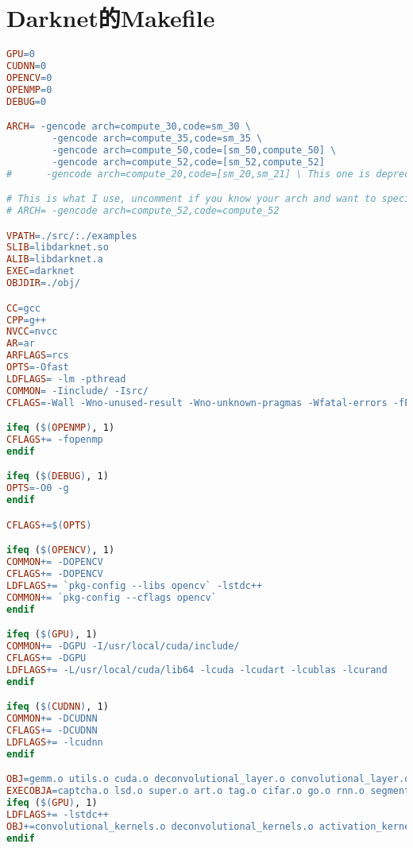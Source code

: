 \chapter{Darknet的Makefile}\label{apdx:Darknet的Makefile}
\begin{lstlisting}[language=make]
GPU=0
CUDNN=0
OPENCV=0
OPENMP=0
DEBUG=0

ARCH= -gencode arch=compute_30,code=sm_30 \
        -gencode arch=compute_35,code=sm_35 \
        -gencode arch=compute_50,code=[sm_50,compute_50] \
        -gencode arch=compute_52,code=[sm_52,compute_52]
#      -gencode arch=compute_20,code=[sm_20,sm_21] \ This one is deprecated?

# This is what I use, uncomment if you know your arch and want to specify
# ARCH= -gencode arch=compute_52,code=compute_52

VPATH=./src/:./examples
SLIB=libdarknet.so
ALIB=libdarknet.a
EXEC=darknet
OBJDIR=./obj/

CC=gcc
CPP=g++
NVCC=nvcc 
AR=ar
ARFLAGS=rcs
OPTS=-Ofast
LDFLAGS= -lm -pthread 
COMMON= -Iinclude/ -Isrc/
CFLAGS=-Wall -Wno-unused-result -Wno-unknown-pragmas -Wfatal-errors -fPIC

ifeq ($(OPENMP), 1) 
CFLAGS+= -fopenmp
endif

ifeq ($(DEBUG), 1) 
OPTS=-O0 -g
endif

CFLAGS+=$(OPTS)

ifeq ($(OPENCV), 1) 
COMMON+= -DOPENCV
CFLAGS+= -DOPENCV
LDFLAGS+= `pkg-config --libs opencv` -lstdc++
COMMON+= `pkg-config --cflags opencv` 
endif

ifeq ($(GPU), 1) 
COMMON+= -DGPU -I/usr/local/cuda/include/
CFLAGS+= -DGPU
LDFLAGS+= -L/usr/local/cuda/lib64 -lcuda -lcudart -lcublas -lcurand
endif

ifeq ($(CUDNN), 1) 
COMMON+= -DCUDNN 
CFLAGS+= -DCUDNN
LDFLAGS+= -lcudnn
endif

OBJ=gemm.o utils.o cuda.o deconvolutional_layer.o convolutional_layer.o list.o image.o activations.o im2col.o col2im.o blas.o crop_layer.o dropout_layer.o maxpool_layer.o softmax_layer.o data.o matrix.o network.o connected_layer.o cost_layer.o parser.o option_list.o detection_layer.o route_layer.o upsample_layer.o box.o normalization_layer.o avgpool_layer.o layer.o local_layer.o shortcut_layer.o logistic_layer.o activation_layer.o rnn_layer.o gru_layer.o crnn_layer.o demo.o batchnorm_layer.o region_layer.o reorg_layer.o tree.o  lstm_layer.o l2norm_layer.o yolo_layer.o iseg_layer.o image_opencv.o
EXECOBJA=captcha.o lsd.o super.o art.o tag.o cifar.o go.o rnn.o segmenter.o regressor.o classifier.o coco.o yolo.o detector.o nightmare.o instance-segmenter.o darknet.o
ifeq ($(GPU), 1) 
LDFLAGS+= -lstdc++ 
OBJ+=convolutional_kernels.o deconvolutional_kernels.o activation_kernels.o im2col_kernels.o col2im_kernels.o blas_kernels.o crop_layer_kernels.o dropout_layer_kernels.o maxpool_layer_kernels.o avgpool_layer_kernels.o
endif


\end{lstlisting}
